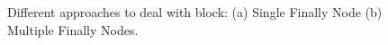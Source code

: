 \begin{figure}[!ht]
\begin{center}
\qquad\qquad\qquad
{}
\caption{Different approaches to deal with  block:
(a) Single Finally Node (b) Multiple Finally
Nodes.}\label{fig-finally}
\end{center}
\end{figure}
